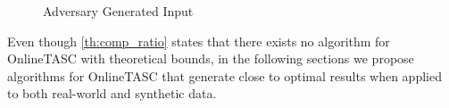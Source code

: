 \begin{figure}[h]
    \centering
    \vspace{-0.15in}
    \caption{Adversary Generated Input}
    \label{fig:quality}
\end{figure}

Even though \cref{th:comp_ratio} states that there exists no algorithm for OnlineTASC with theoretical bounds, in the following sections we propose algorithms for OnlineTASC that generate close to optimal results when applied to both real-world and synthetic data.



